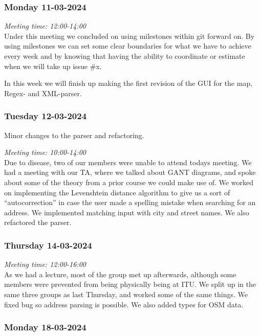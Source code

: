 \hypertarget{monday-11-03-2024}{%
\subsubsection*{Monday 11-03-2024}\label{monday-11-03-2024}}

\emph{Meeting time: 12:00-14:00}\\
Under this meeting we concluded on using milestones within git forward
on. By using milestones we can set some clear boundaries for what we
have to achieve every week and by knowing that having the ability to
coordinate or estimate when we will take up issue \#x.

In this week we will finish up making the first revision of the GUI for
the map, Regex- and XML-parser.

\hypertarget{tuesday-12-03-2024}{%
\subsubsection*{Tuesday 12-03-2024}\label{tuesday-12-03-2024}}

Minor changes to the parser and refactoring.

\emph{Meeting time: 10:00-14:00}\\
Due to disease, two of our members were unable to attend todays meeting.
We had a meeting with our TA, where we talked about GANT diagrams, and
spoke about some of the theory from a prior course we could make use of.
We worked on implementing the Levenshtein distance algorithm to give us
a sort of ``autocorrection'' in case the user made a spelling mistake
when searching for an address. We implemented matching input with city
and street names. We also refactored the parser.

\hypertarget{thursday-14-03-2024}{%
\subsubsection*{Thursday 14-03-2024}\label{thursday-14-03-2024}}

\emph{Meeting time: 12:00-16:00}\\
As we had a lecture, most of the group met up afterwards, although some
members were prevented from being physically being at ITU. We split up
in the same three groups as last Thursday, and worked some of the same
things. We fixed bug so address parsing is possible. We also added types
for OSM data.

\hypertarget{monday-18-03-2024}{%
\subsubsection*{Monday 18-03-2024}\label{monday-18-03-2024}}

